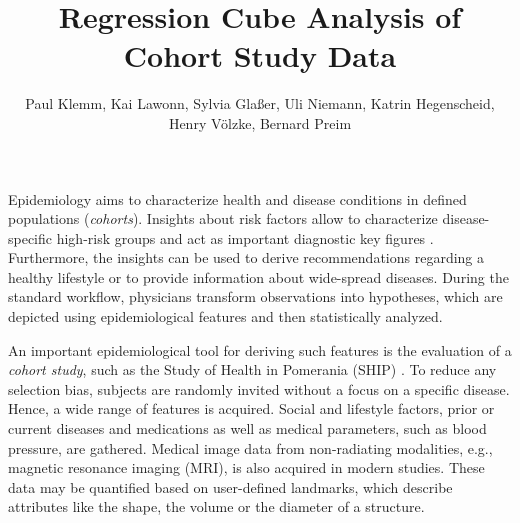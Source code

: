\documentclass[journal]{style/vgtc} 			          %
\title{Regression Cube Analysis of Cohort Study Data}
\author{Paul Klemm, Kai Lawonn, Sylvia Gla{\ss}er, Uli Niemann, Katrin Hegenscheid, Henry V{\"o}lzke, Bernard Preim}
\begin{document}


\maketitle
Epidemiology aims to characterize health and disease conditions in defined populations (\emph{cohorts}).
Insights about risk factors allow to characterize disease-specific high-risk groups and act as important diagnostic key figures \cite{Fletcher2012}.
Furthermore, the insights can be used to derive recommendations regarding a healthy lifestyle or to provide information about wide-spread diseases.
During the standard workflow, physicians transform observations into hypotheses, which are depicted using epidemiological features and then statistically analyzed.

An important epidemiological tool for deriving such features is the evaluation of a \emph{cohort study}, such as the Study of Health in Pomerania (SHIP) \cite{Volzke2011}.
To reduce any selection bias, subjects are randomly invited without a focus on a specific disease.
Hence, a wide range of features is acquired.
%
Social and lifestyle factors, prior or current diseases and medications as well as medical parameters, such as blood pressure, are gathered.
Medical image data from non-radiating modalities, e.g., magnetic resonance imaging (MRI), is also acquired in modern studies.
These data may be quantified based on user-defined landmarks, which describe attributes like the shape, the volume or the diameter of a structure.
\end{document}
